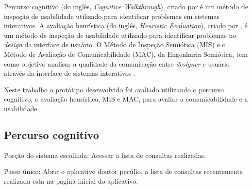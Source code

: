 
Percurso cognitivo (do inglês, \emph{Cognitive Walkthrough}), criado por
 é um método de inspeção de
usabilidade utilizado para identificar problemas em sistemas interativos.
A avaliação heurística (do inglês, \emph{Heuristic Evaluation}), criado
por , é um método de inspeção
de usabilidade utilizado para identificar problemas no
\emph{design} da interface de usuário.
O Método de Inspeção Semiótica (MIS) e o Método de Avaliação de 
Comunicabilidade (MAC), da Engenharia Semiótica, tem como
objetivo analisar a qualidade da comunicação entre
\emph{designer} e usuário através da interface de sistemas interativos
\cite{deSouza:2006:SIM:1298023.1298044}.

Neste trabalho o protótipo desenvolvido foi avaliado utilizando o 
percurso cognitivo, a avaliação heurística, MIS e MAC, para avaliar
a comunicabilidade e a usabilidade.

\subsection{Percurso cognitivo}

Porção do sistema escolhida: Acessar a lista de consultas realizadas.

Passo único: Abrir o aplicativo doutor pecúlio, a lista de consultas recentemente realizada esta 
na pagina inicial do aplicativo.

